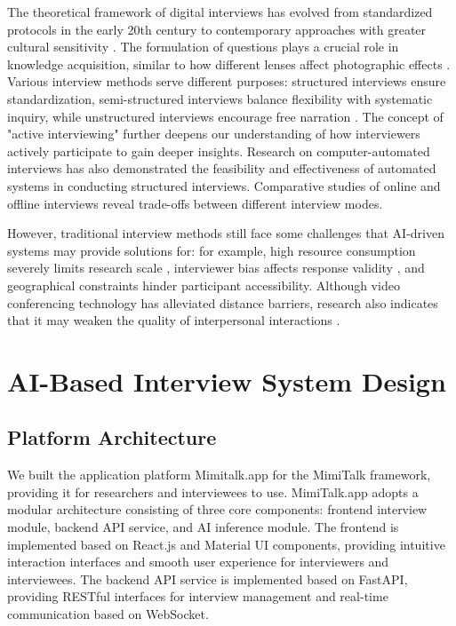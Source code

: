 \documentclass[sigchi,nonacm,manuscript]{acmart}
\begin{document}
The theoretical framework of digital interviews has evolved from standardized protocols in the early 20th century to contemporary approaches with greater cultural sensitivity \citep{brinkmann2018}. The formulation of questions plays a crucial role in knowledge acquisition, similar to how different lenses affect photographic effects \citep{briggs2003questionformulation}. Various interview methods serve different purposes: structured interviews ensure standardization, semi-structured interviews balance flexibility with systematic inquiry, while unstructured interviews encourage free narration \citep{kvale2021, seidman2019}. The concept of "active interviewing" \citep{holsteinActiveInterview1995} further deepens our understanding of how interviewers actively participate to gain deeper insights. Research on computer-automated interviews \citep{pickardUsingComputerAutomated2020} has also demonstrated the feasibility and effectiveness of automated systems in conducting structured interviews. Comparative studies of online and offline interviews \citep{shapkaOnlineInpersonInterviews2016} reveal trade-offs between different interview modes.

However, traditional interview methods still face some challenges that AI-driven systems may provide solutions for: for example, high resource consumption severely limits research scale \citep{seidman2019}, interviewer bias affects response validity \citep{kvale2021}, and geographical constraints hinder participant accessibility. Although video conferencing technology has alleviated distance barriers, research also indicates that it may weaken the quality of interpersonal interactions \citep{brinkmann2018}.

\section{AI-Based Interview System Design}

\subsection{Platform Architecture}
We built the application platform Mimitalk.app for the MimiTalk framework, providing it for researchers and interviewees to use. MimiTalk.app adopts a modular architecture consisting of three core components: frontend interview module, backend API service, and AI inference module. The frontend is implemented based on React.js and Material UI components, providing intuitive interaction interfaces and smooth user experience for interviewers and interviewees. The backend API service is implemented based on FastAPI, providing RESTful interfaces for interview management and real-time communication based on WebSocket.
\end{document}
